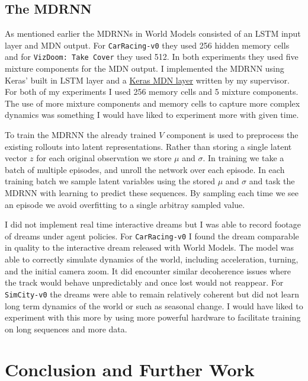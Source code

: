 \documentclass{article}
\numberwithin{figure}{section}
\theoremstyle{definition}
\begin{document}
\subsection{The MDRNN}
\label{MDRNNsubsec}
As mentioned earlier the MDRNNs in World Models consisted of an LSTM input layer and MDN output.
For \texttt{CarRacing-v0} they used 256 hidden memory cells and for \texttt{VizDoom: Take Cover} they used 512.
In both experiments they used five mixture components for the MDN output.
I implemented the MDRNN using Keras' built in LSTM layer and a \href{https://github.com/cpmpercussion/keras-mdn-layer}{Keras MDN layer} written by my supervisor.
For both of my experiments I used 256 memory cells and 5 mixture components.
The use of more mixture components and memory cells to capture more complex dynamics was something I would have liked to experiment more with given time.

To train the MDRNN the already trained $V$ component is used to preprocess the existing rollouts into latent representations.
Rather than storing a single latent vector $z$ for each original observation we store $\mu$ and $\sigma$.
In training we take a batch of multiple episodes, and unroll the network over each episode.
In each training batch we sample latent variables using the stored $\mu$ and $\sigma$ and task the MDRNN with learning to predict these sequences.
By sampling each time we see an episode we avoid overfitting to a single arbitray sampled value.

I did not implement real time interactive dreams but I was able to record footage of dreams under agent policies.
For \texttt{CarRacing-v0} I found the dream comparable in quality to the interactive dream released with World Models.
The model was able to correctly simulate dynamics of the world, including acceleration, turning, and the initial camera zoom.
It did encounter similar decoherence issues where the track would behave unpredictably and once lost would not reappear.
For \texttt{SimCity-v0} the dreams were able to remain relatively coherent but did not learn long term dynamics of the world or such as seasonal change.
I would have liked to experiment with this more by using more powerful hardware to facilitate training on long sequences and more data.


\section{Conclusion and Further Work}



\clearpage
 
\end{document}
